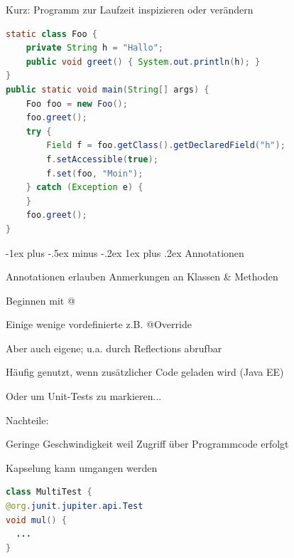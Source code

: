 \documentclass[10pt]{article}
\makeatletter
\renewcommand{\subsubsection}{\@startsection{subsubsection}{3}{0mm}%
                                {-1ex plus -.5ex minus -.2ex}%
                                {1ex plus .2ex}%
                                {\normalfont\small\bfseries}}
\makeatother
\begin{document}
Kurz: Programm zur Laufzeit inspizieren oder verändern

\begin{lstlisting}[language=java]
static class Foo {
    private String h = "Hallo";
    public void greet() { System.out.println(h); }
}
public static void main(String[] args) {
    Foo foo = new Foo();
    foo.greet();
    try {
        Field f = foo.getClass().getDeclaredField("h");
        f.setAccessible(true);
        f.set(foo, "Moin");
    } catch (Exception e) {
    }
    foo.greet();
}
\end{lstlisting}

\subsubsection{Annotationen}
\begin{itemize*}
  \item Annotationen erlauben Anmerkungen an Klassen \& Methoden
  \item Beginnen mit @
  \item Einige wenige vordefinierte z.B. @Override
  \item Aber auch eigene; u.a. durch Reflections abrufbar
  \item Häufig genutzt, wenn zusätzlicher Code geladen wird (Java EE)
  \item Oder um Unit-Tests zu markieren...
  \item Nachteile:
  \begin{itemize*}
    \item Geringe Geschwindigkeit weil Zugriff über Programmcode erfolgt
    \item Kapselung kann umgangen werden
  \end{itemize*}
\end{itemize*}

\begin{lstlisting}[language=java]
class MultiTest {
@org.junit.jupiter.api.Test
void mul() {
  ...
}
\end{lstlisting}
\end{document}
